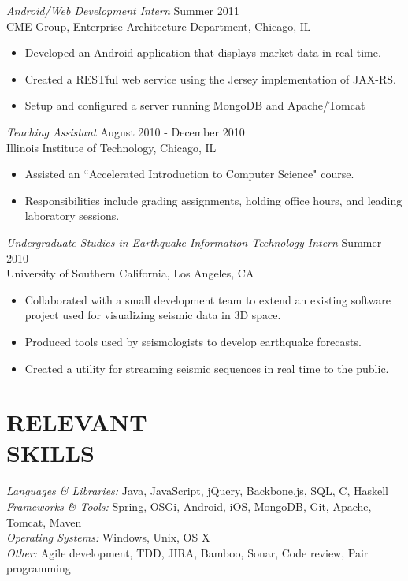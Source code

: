\documentclass[margin]{res}
\begin{document}
\begin{resume}
                {\sl Android/Web Development Intern} \hfill            Summer 2011 \\
                CME Group, Enterprise Architecture Department, Chicago, IL
                 \begin{itemize}  \itemsep -2pt %
                 \item Developed an Android application that displays market data in real time.
                 \item Created a RESTful web service using the Jersey implementation of JAX-RS.
                 \item Setup and configured a server running MongoDB and Apache/Tomcat
                 \end{itemize} 
                 
                {\sl Teaching Assistant} \hfill        August 2010 - December 2010 \\
                Illinois Institute of Technology, Chicago, IL
                  \begin{itemize}
                   \item Assisted an ``Accelerated Introduction to Computer Science" course.
                   \item Responsibilities include grading assignments, holding office hours, and leading laboratory sessions.
                   \end{itemize}
                   
                {\sl Undergraduate Studies in Earthquake Information Technology Intern} \hfill        Summer 2010 \\
                University of Southern California, Los Angeles, CA
                 \begin{itemize}
                  \item Collaborated with a small development team to extend an existing software project used for visualizing seismic data in 3D space.
                  \item Produced tools used by seismologists to develop earthquake forecasts.
                  \item Created a utility for streaming seismic sequences in real time to the public.
                  \end{itemize} 
 
\section{RELEVANT \\ SKILLS} {\sl Languages \& Libraries:} Java, JavaScript, jQuery, Backbone.js, SQL, C, Haskell \\
                				{\sl Frameworks \& Tools:} Spring, OSGi, Android, iOS, MongoDB, Git, Apache, Tomcat, Maven \\
                                {\sl Operating Systems:} Windows, Unix, OS X \\
                                {\sl Other:} Agile development, TDD, JIRA, Bamboo, Sonar, Code review, Pair programming
 

\end{resume}
\end{document}
